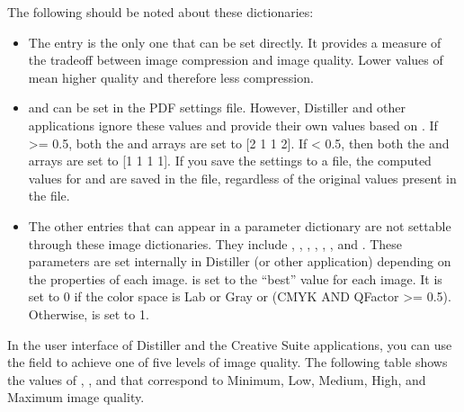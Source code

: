 \documentclass[letterpaper,12pt,english,openany,oneside]{sphinxmanual}
\begin{document}
The following should be noted about these dictionaries:
\begin{itemize}
\item {} 
The  entry is the only one that can be set directly. It provides a measure of the trade\sphinxhyphen{}off between image compression and image quality. Lower values of  mean higher quality and therefore less compression.

\item {} 
 and  can be set in the PDF settings file. However, Distiller and other applications ignore these values and provide their own values based on  . If  >= 0.5, both the  and  arrays are set to {[}2 1 1 2{]}. If  < 0.5, then both the  and  arrays are set to {[}1 1 1 1{]}. If you save the settings to a file, the computed values for  and  are saved in the file, regardless of the original values present in the file.

\item {} 
The other entries that can appear in a  parameter dictionary are not settable through these image dictionaries. They include  ,  ,  ,  ,  ,  , and  . These parameters are set internally in Distiller (or other application) depending on the properties of each image.  is set to the “best” value for each image. It is set to 0 if the color space is Lab or Gray or (CMYK AND QFactor >= 0.5). Otherwise,  is set to 1.

\end{itemize}

In the user interface of Distiller and the Creative Suite applications, you can use the  field to achieve one of five levels of image quality. The following table shows the values of  ,  , and  that correspond to Minimum, Low, Medium, High, and Maximum image quality.
\end{document}
